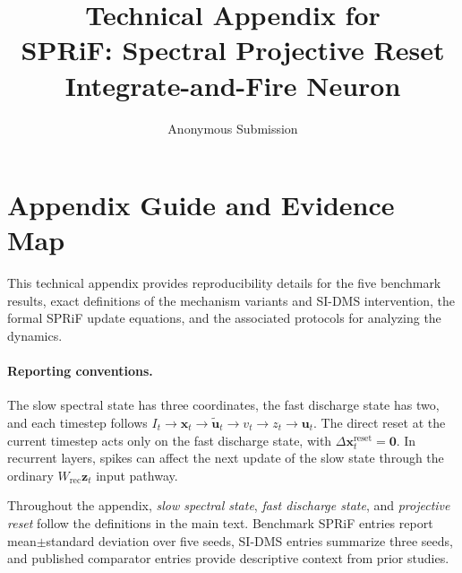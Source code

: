\documentclass[letterpaper]{article}
\title{Technical Appendix for\\
SPRiF: Spectral Projective Reset Integrate-and-Fire Neuron}
\author{Anonymous Submission}
\date{}
\begin{document}
\maketitle

\section{Appendix Guide and Evidence Map}
\label{supp:sec:guide}

This technical appendix provides reproducibility details for the five benchmark results, exact definitions of the mechanism variants and SI-DMS intervention, the formal SPRiF update equations, and the associated protocols for analyzing the dynamics.

\paragraph{Reporting conventions.}
The slow spectral state has three coordinates, the fast discharge state has two, and each timestep follows $I_t\to\mathbf{x}_t\to\widetilde{\mathbf{u}}_t\to v_t\to z_t\to\mathbf{u}_t$. The direct reset at the current timestep acts only on the fast discharge state, with $\Delta\mathbf{x}_t^{\mathrm{reset}}=\mathbf{0}$. In recurrent layers, spikes can affect the next update of the slow state through the ordinary $W_{\mathrm{rec}}\mathbf{z}_t$ input pathway.

Throughout the appendix, \emph{slow spectral state}, \emph{fast discharge state}, and \emph{projective reset} follow the definitions in the main text. Benchmark SPRiF entries report mean$\pm$standard deviation over five seeds, SI-DMS entries summarize three seeds, and published comparator entries provide descriptive context from prior studies.
\end{document}
